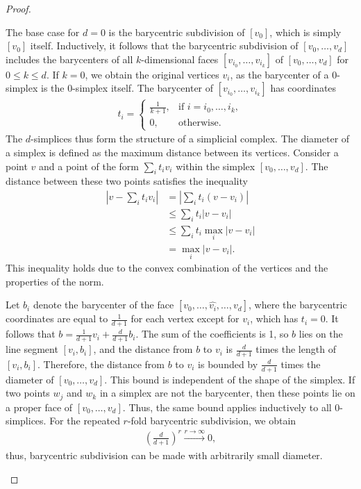 \begin{proof}{\textit{\cite[Proof of Proposition 2.21]{hatcher2005algebraic}}}
\begin{enumerate}
	The base case for $d=0$ is the barycentric subdivision of $[v_0]$, which is simply $[v_0]$ itself. Inductively, it follows that the barycentric subdivision of $[v_0, \ldots, v_d]$ includes the barycenters of all $k$-dimensional faces $[v_{i_0}, \ldots, v_{i_k}]$ of $[v_0, \ldots, v_d]$ for $0 \leq k \leq d$. If $k=0$, we obtain the original vertices $v_i$, as the barycenter of a $0$-simplex is the $0$-simplex itself. The barycenter of $[v_{i_0}, \ldots, v_{i_k}]$ has coordinates
	\begin{align}
		t_i = \begin{cases}
		\frac{1}{k+1}, & \text{if } i = i_0, \ldots, i_k, \\
		0,             & \text{otherwise}.                
		\end{cases}
	\end{align}
	The \(d\)-simplices thus form the structure of a simplicial complex. The diameter of a simplex is defined as the maximum distance between its vertices. Consider a point \(v\) and a point of the form \(\sum_i t_i v_i\) within the simplex \([v_0, \ldots, v_d]\). The distance between these two points satisfies the inequality
	\begin{align}
		\left\lvert v - \sum_i t_i v_i \right\rvert & = \left\lvert \sum_i t_i(v - v_i) \right\rvert \nonumber\\
		                                            & \leq \sum_i t_i \left\lvert v - v_i \right\rvert \nonumber\\
		                                            & \leq \sum_i t_i \max_i \left\lvert v - v_i \right\rvert \nonumber\\
		                                            & = \max_i \left\lvert v - v_i \right\rvert.              
	\end{align}
	This inequality holds due to the convex combination of the vertices and the properties of the norm.
			
	Let \(b_i\) denote the barycenter of the face \([v_0, \ldots, \hat{v_i}, \ldots, v_d]\), where the barycentric coordinates are equal to \(\frac{1}{d+1}\) for each vertex except for \(v_i\), which has \(t_i = 0\). It follows that \(b = \frac{1}{d+1} v_i + \frac{d}{d+1} b_i\). The sum of the coefficients is 1, so \(b\) lies on the line segment \([v_i, b_i]\), and the distance from \(b\) to \(v_i\) is \(\frac{d}{d+1}\) times the length of \([v_i, b_i]\). Therefore, the distance from \(b\) to \(v_i\) is bounded by \(\frac{d}{d+1}\) times the diameter of \([v_0, \ldots, v_d]\). This bound is independent of the shape of the simplex. If two points \(w_j\) and \(w_k\) in a simplex are not the barycenter, then these points lie on a proper face of \([v_0, \ldots, v_d]\). Thus, the same bound applies inductively to all \(0\)-simplices. For the repeated \(r\)-fold barycentric subdivision, we obtain
	\begin{align}
		\left(\frac{d}{d+1}\right)^r \xrightarrow[]{r \rightarrow \infty} 0, 
	\end{align}
	thus, barycentric subdivision can be made with arbitrarily small diameter.
			

\end{enumerate}
\end{proof}
